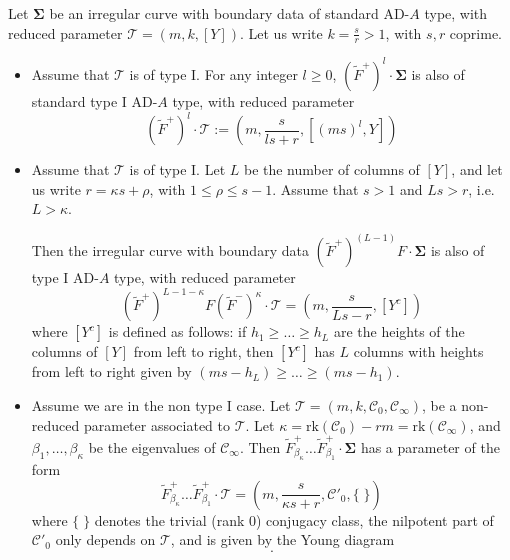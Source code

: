 \documentclass[11pt,a4paper]{amsart}
\numberwithin{equation}{section}
\begin{document}
\begin{theorem}
Let $\bm\Sigma$ be an irregular curve with boundary data of standard AD-$A$ type, with reduced parameter $\mathscr T=(m,k,[Y])$. Let us write $k=\frac{s}{r}>1$, with $s, r$ coprime.
\begin{itemize}
\item Assume that $\mathscr T$ is of type I. For any integer $l\geq 0$, $(\widetilde{F}^+)^l\cdot\bm\Sigma
$ is also of standard type I AD-$A$ type, with reduced parameter
\begin{equation}
(\widetilde{F}^+)^l\cdot\mathscr T:=\left(m, \frac{s}{ls+r}, [(ms)^l,Y]\right)
\end{equation}
\item Assume that $\mathscr T$ is of type I. Let $L$ be the number of columns of $[Y]$, and let us write $r=\kappa s +\rho$, with $1\leq \rho\leq s-1$. Assume that $s>1$ and $Ls>r$, i.e. $L>\kappa$.

Then the irregular curve with boundary data  $(\widetilde{F}^+)^{(L-1)}F\cdot\bm\Sigma
$ is also of type I AD-$A$ type, with reduced parameter
\begin{equation}
\label{eq:duality_II_intro}
(\widetilde{F}^+)^{L-1-\kappa} F (\widetilde{F}^-)^{\kappa} \cdot\mathscr T=\left(m, \frac{s}{Ls-r}, [Y^c]\right)
\end{equation}
where $[Y^c]$ is defined as follows: if $h_1\geq \dots\geq h_L$ are the heights of the columns of $[Y]$ from left to right, then $[Y^c]$ has $L$ columns with heights from left to right given by $(ms-h_L)\geq \dots \geq (ms-h_1)$.
\item Assume we are in the non type I case. Let $\mathcal T=(m, k, \mathcal C_0, \mathcal C_\infty)$, be a non-reduced parameter associated to $\mathscr T$. Let $\kappa=\mathrm{rk}(\mathcal C_0)-rm=\mathrm{rk}(\mathcal C_\infty)$, and $\beta_1, \dots, \beta_\kappa$ be the eigenvalues of $\mathcal C_\infty$. Then $\widetilde{F}^+_{\beta_\kappa}\dots\widetilde{F}^+_{\beta_1}\cdot \bm\Sigma$ has a parameter of the form
\begin{equation}
\widetilde{F}^+_{\beta_\kappa}\dots\widetilde{F}^+_{\beta_1}\cdot \mathcal T=\left(m, \frac{s}{\kappa s+r}, \mathcal C'_0, \{ \;\} \right)
\end{equation}
where $\{\;\}$ denotes the trivial (rank 0) conjugacy class, the nilpotent part of $\mathcal C'_0$ only depends on $\mathscr T$, and is given by the Young diagram
\begin{equation}
[(ms-1)^\kappa, Y].
\end{equation}
\end{itemize}
\end{theorem}
\end{document}
